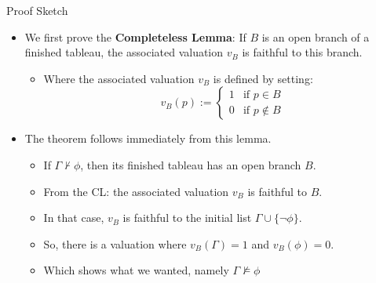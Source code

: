 \begin{frame}{Proof Sketch}

	\begin{itemize}%
	\itemsep=16pt

	\item We first prove the \textbf{Completeless Lemma}: If $B$ is an open branch of a finished tableau, the associated valuation $v_B$ is faithful to this branch.
	
	\smallskip

		\begin{itemize}
		\item[] Where the associated valuation $v_B$ is defined by setting:\[v_B(p):=\begin{cases} 1 &\text{if }p\in B\\0&\text{if }p\notin B\end{cases}\]	
		\end{itemize}
	
	\item The theorem follows immediately from this lemma.
		\begin{itemize}%
		\item If $\Gamma\nvdash\phi$, then its finished tableau has an open branch $B$.
		\item From the CL: the associated valuation $v_B$ is faithful to $B$.
		\item In that case, $v_B$ is faithful to the initial list $\Gamma\cup\{\neg\phi\}$.
		\item So, there is a valuation where $v_B(\Gamma)=1$ and $v_B(\phi)=0$.
		\item Which shows what we wanted, namely $\Gamma\nvDash\phi$
		\end{itemize}
                  
	\end{itemize}

\end{frame}



